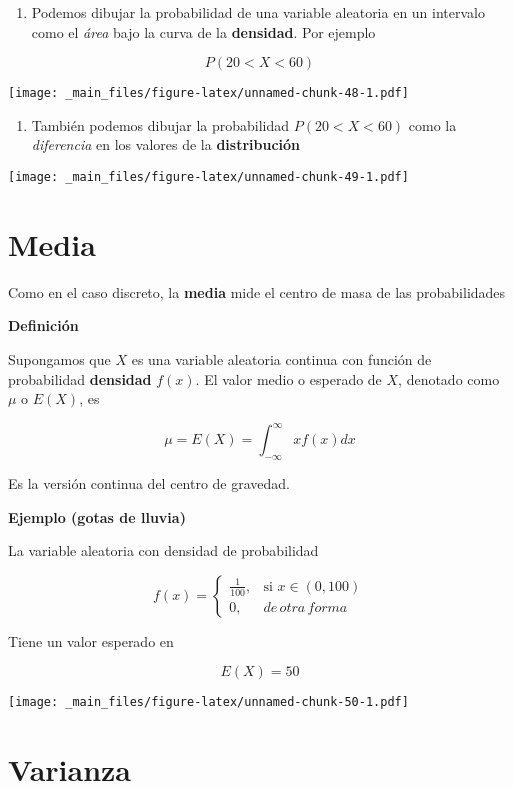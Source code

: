 \documentclass[
]{book}
\providecommand{\tightlist}{%
  \setlength{\itemsep}{0pt}\setlength{\parskip}{0pt}}
\begin{document}
\begin{enumerate}
\def\labelenumi{\arabic{enumi})}
\tightlist
\item
  Podemos dibujar la probabilidad de una variable aleatoria en un intervalo como el \emph{área} bajo la curva de la \textbf{densidad}. Por ejemplo
\end{enumerate}

\[P(20<X< 60)\]

\texttt{[image: \_main\_files/figure-latex/unnamed-chunk-48-1.pdf]}

\begin{enumerate}
\def\labelenumi{\arabic{enumi})}
\setcounter{enumi}{1}
\tightlist
\item
  También podemos dibujar la probabilidad \(P(20<X< 60)\) como la \emph{diferencia} en los valores de la \textbf{distribución}
\end{enumerate}

\texttt{[image: \_main\_files/figure-latex/unnamed-chunk-49-1.pdf]}

\hypertarget{media}{%
\section{Media}\label{media}}

Como en el caso discreto, la \textbf{media} mide el centro de masa de las probabilidades

\textbf{Definición}

Supongamos que \(X\) es una variable aleatoria continua con función de probabilidad \textbf{densidad} \(f(x)\). El valor medio o esperado de \(X\), denotado como \(\mu\) o \(E(X)\), es

\[\mu=E(X)=\int_{-\infty}^\infty x f(x) dx\]

Es la versión continua del centro de gravedad.

\textbf{Ejemplo (gotas de lluvia)}

La variable aleatoria con densidad de probabilidad

\[
    f(x)= 
\begin{cases}
    \frac{1}{100},& \text{si } x\in (0,100)\\
    0,& de\, otra\, forma 
\end{cases}
\]

Tiene un valor esperado en

\[E(X)=50\]

\texttt{[image: \_main\_files/figure-latex/unnamed-chunk-50-1.pdf]}

\hypertarget{varianza-1}{%
\section{Varianza}\label{varianza-1}}
\end{document}

